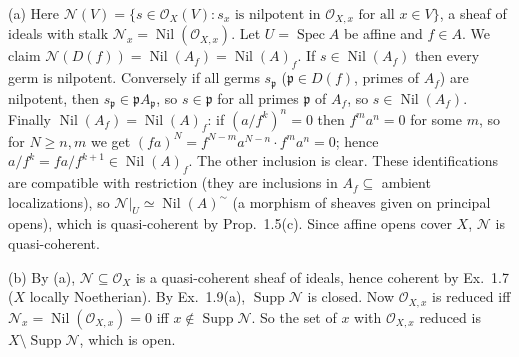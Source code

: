 \documentclass[11pt]{article}
\begin{document}
\pf
(a) Here $\mathcal{N}(V)=\{s\in\mathcal{O}_X(V): s_x\text{ is nilpotent in }\mathcal{O}_{X,x}\text{ for all }x\in V\}$, a sheaf of ideals with stalk $\mathcal{N}_x=\operatorname{Nil}(\mathcal{O}_{X,x})$. Let $U=\operatorname{Spec}A$ be affine and $f\in A$. We claim $\mathcal{N}(D(f))=\operatorname{Nil}(A_f)=\operatorname{Nil}(A)_f$. If $s\in\operatorname{Nil}(A_f)$ then every germ is nilpotent. Conversely if all germs $s_\mathfrak{p}$ ($\mathfrak{p}\in D(f)$, primes of $A_f$) are nilpotent, then $s_\mathfrak{p}\in\mathfrak{p}A_\mathfrak{p}$, so $s\in\mathfrak{p}$ for all primes $\mathfrak{p}$ of $A_f$, so $s\in\operatorname{Nil}(A_f)$. Finally $\operatorname{Nil}(A_f)=\operatorname{Nil}(A)_f$: if $(a/f^k)^n=0$ then $f^ma^n=0$ for some $m$, so for $N\ge n,m$ we get $(fa)^N=f^{N-m}a^{N-n}\cdot f^ma^n=0$; hence $a/f^k=fa/f^{k+1}\in\operatorname{Nil}(A)_f$. The other inclusion is clear. These identifications are compatible with restriction (they are inclusions in $A_f\subseteq$ ambient localizations), so $\mathcal{N}|_U\simeq\operatorname{Nil}(A)^\sim$ (a morphism of sheaves given on principal opens), which is quasi-coherent by Prop.~1.5(c). Since affine opens cover $X$, $\mathcal{N}$ is quasi-coherent.

(b) By (a), $\mathcal{N}\subseteq\mathcal{O}_X$ is a quasi-coherent sheaf of ideals, hence coherent by Ex.~1.7 ($X$ locally Noetherian). By Ex.~1.9(a), $\operatorname{Supp}\mathcal{N}$ is closed. Now $\mathcal{O}_{X,x}$ is reduced iff $\mathcal{N}_x=\operatorname{Nil}(\mathcal{O}_{X,x})=0$ iff $x\notin\operatorname{Supp}\mathcal{N}$. So the set of $x$ with $\mathcal{O}_{X,x}$ reduced is $X\setminus\operatorname{Supp}\mathcal{N}$, which is open.
\end{document}
